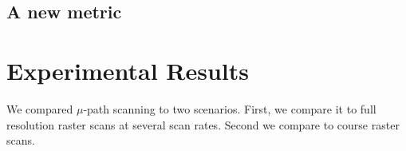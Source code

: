 \documentclass[twocolumn,oneside]{IEEEtran/IEEEtran}
\begin{document}
\subsection{A new metric}
%   


\section{Experimental Results}\label{sec:results}
We compared $\mu$-path scanning to two scenarios. First, we compare it
to full resolution raster scans at several scan rates. Second we
compare to course raster scans.
\end{document}

